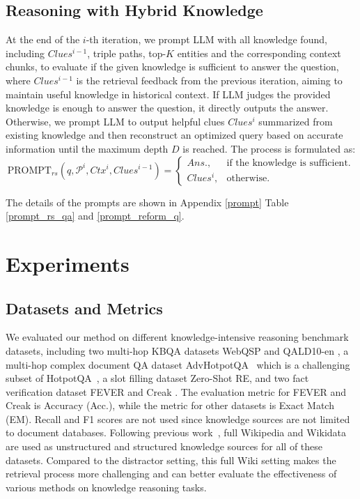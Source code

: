 \documentclass{article} %
\begin{document}
\subsection{Reasoning with Hybrid Knowledge}
At the end of the $i$-th iteration, we prompt LLM with all knowledge found, including $Clues^{i-1}$, triple paths, top-$K$ entities and the corresponding context chunks, to evaluate if the given knowledge is sufficient to answer the question, where $Clues^{i-1}$ is the retrieval feedback from the previous iteration, aiming to maintain useful knowledge in historical context. If LLM judges the provided knowledge is enough to answer the question, it directly outputs the answer. Otherwise, we prompt LLM to output helpful clues $Clues^{i}$ summarized from existing knowledge and then reconstruct an optimized query based on accurate information until the maximum depth $D$ is reached. The process is formulated as:
\begin{equation}
\text{PROMPT}_{rs}(q, \mathcal{P}^i, 
Ctx^i, Clues^{i-1}) =
\begin{cases}
Ans.  , & \text{if the knowledge is sufficient.} \\
Clues^{i} ,& \text{otherwise.}
\end{cases}
\end{equation}

The details of the prompts are shown in Appendix \ref{prompt} Table \ref{prompt_rs_qa} and \ref{prompt_reform_q}.

\section{Experiments}
\subsection{Datasets and Metrics}
We evaluated our method on different knowledge-intensive reasoning benchmark datasets, including two multi-hop KBQA datasets WebQSP \citep{yih2016value} and QALD10-en \citep{usbeck2023qald}, a multi-hop complex document QA dataset AdvHotpotQA~\citep{ye2022unreliability} which is a challenging subset of HotpotQA~\citep{yang2018hotpotqa}, a slot filling dataset Zero-Shot RE\citep{petroni2021kiltbenchmarkknowledgeintensive}, and two fact verification dataset FEVER \citep{thorne2018fever} and Creak \citep{onoe2021creakdatasetcommonsensereasoning}. The evaluation metric for FEVER and Creak is Accuracy (Acc.), while the metric for other datasets is Exact Match (EM). Recall and F1 scores are not used since knowledge sources are not limited to document databases. Following previous work~\citep{li2024cok}, full Wikipedia and Wikidata are used as unstructured and structured knowledge sources for all of these datasets. Compared to the distractor setting, this full Wiki setting makes the retrieval process more challenging and can better evaluate the effectiveness of various methods on knowledge reasoning tasks. 
\end{document}
